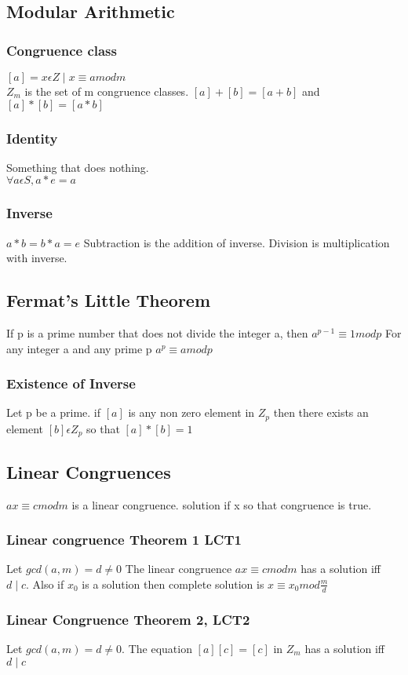 \documentclass[12pt]{article}
\begin{document}
\subsection{Modular Arithmetic}
\subsubsection{Congruence class}
$[a]={x\epsilon Z\mid x\equiv a mod m}$
\\
$Z_m$ is the set of m congruence classes. $[a]+[b]=[a+b]$ and $[a]*[b]=[a*b]$
\subsubsection{Identity}
Something that does nothing. \\ $\forall a \epsilon S, a * e=a$
\subsubsection{Inverse}
$a*b=b*a=e$
Subtraction is the addition of inverse.
Division is multiplication with inverse.
\subsection{Fermat's Little Theorem}
If p is a prime number that does not divide the integer a, then $a^{p-1}
\equiv 1 mod p$
For any integer a and any prime p $a^p\equiv a mod p$
\subsubsection{Existence of Inverse}
Let p be a prime. if $[a]$ is any non zero element in $Z_p$ then there exists an
element $[b]\epsilon Z_p$ so that $[a]*[b]=1$
\subsection{Linear Congruences}
$ax\equiv c mod m$ is a linear congruence. solution if x so that congruence is
true.
\subsubsection{Linear congruence Theorem 1 LCT1}
Let $gcd(a,m)=d\neq 0$ The linear congruence $ax\equiv c mod m$ has a solution
iff $d\mid c$. Also if $x_0$ is a solution then complete solution is $x\equiv x_0
mod \frac{m}{d}$
\subsubsection{Linear Congruence Theorem 2, LCT2}
Let $gcd(a,m)=d\neq 0$. The equation $[a][c]=[c]$ in $Z_m$ has a solution iff
$d\mid c$
\end{document}
